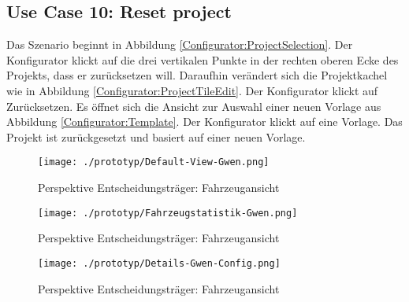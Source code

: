 \subsection{Use Case 10: Reset project}
Das Szenario beginnt in Abbildung \ref{Configurator:ProjectSelection}. Der Konfigurator klickt auf die drei vertikalen Punkte in der rechten oberen Ecke des Projekts, dass er zurücksetzen will. Daraufhin verändert sich die Projektkachel wie in Abbildung \ref{Configurator:ProjectTileEdit}. Der Konfigurator klickt auf Zurücksetzen. Es öffnet sich die Ansicht zur Auswahl einer neuen Vorlage aus Abbildung \ref{Configurator:Template}. Der Konfigurator klickt auf eine Vorlage. Das Projekt ist zurückgesetzt und basiert auf einer neuen Vorlage.

\begin{figure}[ht]
  \centering
  \texttt{[image: ./prototyp/Default-View-Gwen.png]}
  \caption{Perspektive Entscheidungsträger: Fahrzeugansicht}
  \label{DecisionMaker:DetailsRube}
\end{figure}

\begin{figure}[ht]
  \centering
  \texttt{[image: ./prototyp/Fahrzeugstatistik-Gwen.png]}
  \caption{Perspektive Entscheidungsträger: Fahrzeugansicht}
  \label{DecisionMaker:DetailsRube}
\end{figure}

\begin{figure}[ht]
  \centering
  \texttt{[image: ./prototyp/Details-Gwen-Config.png]}
  \caption{Perspektive Entscheidungsträger: Fahrzeugansicht}
  \label{DecisionMaker:DetailsRube}
\end{figure}


